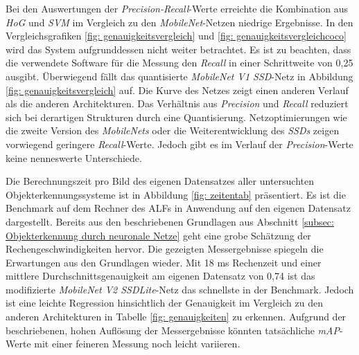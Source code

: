 



Bei den Auswertungen der \textit{Precision-Recall}-Werte erreichte die Kombination aus \textit{HoG} und \textit{SVM} im Vergleich zu den \textit{MobileNet}-Netzen niedrige Ergebnisse. In den Vergleichsgrafiken \ref{fig: genauigkeitsvergleich} und \ref{fig: genauigkeitsvergleichcoco} wird das System aufgrunddessen nicht weiter betrachtet. Es ist zu beachten, dass die verwendete Software für die Messung den \textit{Recall} in einer Schrittweite von 0,25 ausgibt. Überwiegend fällt das quantisierte \textit{MobileNet V1 SSD}-Netz in Abbildung \ref{fig: genauigkeitsvergleich} auf. Die Kurve des Netzes zeigt einen anderen Verlauf als die anderen Architekturen. Das Verhältnis aus \textit{Precision} und \textit{Recall} reduziert sich bei derartigen Strukturen durch eine Quantisierung. Netzoptimierungen wie die zweite Version des \textit{MobileNets} oder die Weiterentwicklung des \textit{SSDs} zeigen vorwiegend geringere \textit{Recall}-Werte. Jedoch gibt es im Verlauf der \textit{Precision}-Werte keine nenneswerte Unterschiede. 







Die Berechnungszeit pro Bild des eigenen Datensatzes aller untersuchten Objekterkennungssysteme ist in Abbildung \ref{fig: zeitentab} präsentiert. Es ist die Benchmark auf dem Rechner des ALFs in Anwendung auf den eigenen Datensatz dargestellt. Bereits aus den beschriebenen Grundlagen aus Abschnitt \ref{subsec: Objekterkennung durch neuronale Netze} geht eine grobe Schätzung der Rechengeschwindigkeiten hervor. Die gezeigten Messergebnisse spiegeln die Erwartungen aus den Grundlagen wieder. Mit 18 ms Rechenzeit und einer mittlere Durchschnittsgenauigkeit am eigenen Datensatz von 0,74 ist das modifizierte \textit{MobileNet V2 SSDLite}-Netz das schnellste in der Benchmark. Jedoch ist eine leichte Regression hinsichtlich der Genauigkeit im Vergleich zu den anderen Architekturen in Tabelle \ref{fig: genauigkeiten} zu erkennen. Aufgrund der beschriebenen, hohen Auflösung der Messergebnisse könnten tatsächliche \textit{mAP}-Werte mit einer feineren Messung noch leicht variieren.    \\  

